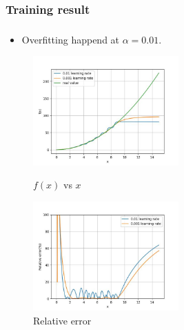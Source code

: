 \documentclass{beamer}
\begin{document}
    \subsubsection*{Training result}
    \begin{frame}
        \frametitle{\subsubsecname}
        \begin{itemize}
            \item Overfitting happend at $\alpha=0.01$.
        \end{itemize}

        \begin{figure}
            \centering
            \begin{multicols}{2}
                \includegraphics[width=2.2in]{figs/Value_50_2.jpg}
                \caption{$f(x)$ vs $x$}
                \columnbreak

                \includegraphics[width=2.2in]{figs/Error_50_2.jpg}
                \caption{Relative error}
            \end{multicols}
        \end{figure}
    \end{frame}
\end{document}
